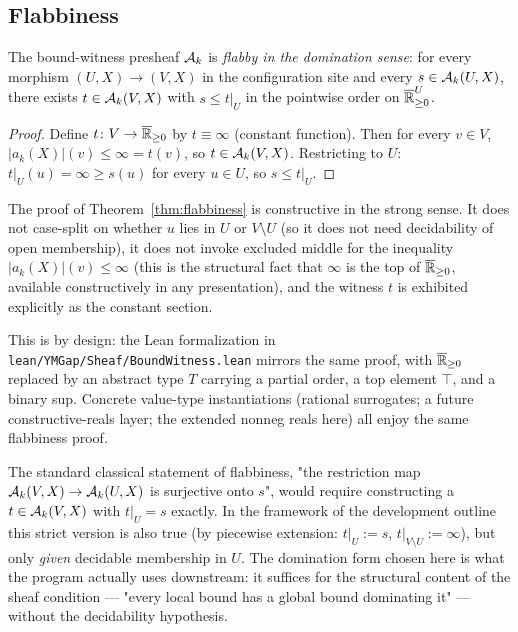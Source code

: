 \subsection{Flabbiness}
\label{sec:flabby}

\begin{theorem}
\label{thm:flabbiness}
The bound-witness presheaf $\mathcal{A}_k$ is \emph{flabby in the domination sense}: for every morphism $(U, X) \to (V, X)$ in the configuration site and every $s \in \mathcal{A}_k(U, X)$, there exists $t \in \mathcal{A}_k(V, X)$ with $s \le t|_U$ in the pointwise order on $\overline{\mathbb{R}}_{\ge 0}^U$.
\end{theorem}

\begin{proof}
Define $t \colon V \to \overline{\mathbb{R}}_{\ge 0}$ by $t \equiv \infty$ (constant function).  Then for every $v \in V$, $|a_k(X)|(v) \le \infty = t(v)$, so $t \in \mathcal{A}_k(V, X)$.  Restricting to $U$: $t|_U(u) = \infty \ge s(u)$ for every $u \in U$, so $s \le t|_U$.
\end{proof}

\begin{remark}
\label{rem:flabby-constructive}
The proof of Theorem~\ref{thm:flabbiness} is constructive in the strong sense.  It does not case-split on whether $u$ lies in $U$ or $V \setminus U$ (so it does not need decidability of open membership), it does not invoke excluded middle for the inequality $|a_k(X)|(v) \le \infty$ (this is the structural fact that $\infty$ is the top of $\overline{\mathbb{R}}_{\ge 0}$, available constructively in any presentation), and the witness $t$ is exhibited explicitly as the constant section.

This is by design: the Lean formalization in \texttt{lean/YMGap/Sheaf/BoundWitness.lean} mirrors the same proof, with $\overline{\mathbb{R}}_{\ge 0}$ replaced by an abstract type $T$ carrying a partial order, a top element $\top$, and a binary sup.  Concrete value-type instantiations (rational surrogates; a future constructive-reals layer; the extended nonneg reals here) all enjoy the same flabbiness proof.
\end{remark}

\begin{remark}
\label{rem:domination-flabby}
The standard classical statement of flabbiness, "the restriction map $\mathcal{A}_k(V, X) \to \mathcal{A}_k(U, X)$ is surjective onto $s$", would require constructing a $t \in \mathcal{A}_k(V, X)$ with $t|_U = s$ exactly.  In the framework of the development outline this strict version is also true (by piecewise extension: $t|_U := s$, $t|_{V \setminus U} := \infty$), but only \emph{given} decidable membership in $U$.  The domination form chosen here is what the program actually uses downstream: it suffices for the structural content of the sheaf condition --- "every local bound has a global bound dominating it" --- without the decidability hypothesis.
\end{remark}

